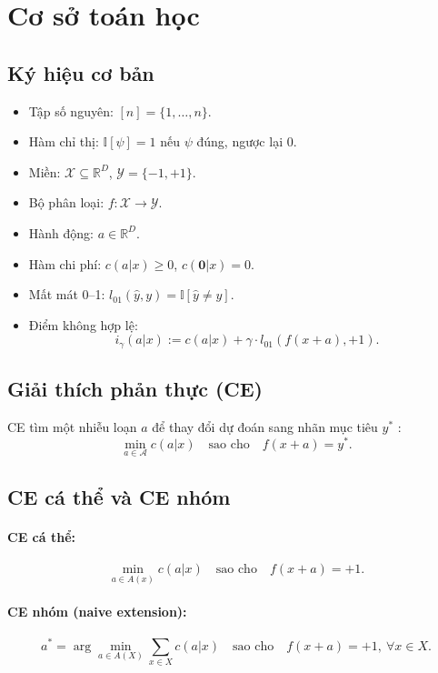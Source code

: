 \section{Cơ sở toán học}

\subsection{Ký hiệu cơ bản}
\begin{itemize}
    \item Tập số nguyên: $[n] = \{1,\dots,n\}$.
    \item Hàm chỉ thị: $\mathbb{I}[\psi] = 1$ nếu $\psi$ đúng, ngược lại $0$.
    \item Miền: $\mathcal{X} \subseteq \mathbb{R}^D$, $\mathcal{Y} = \{-1,+1\}$.
    \item Bộ phân loại: $f: \mathcal{X} \to \mathcal{Y}$.
    \item Hành động: $a \in \mathbb{R}^D$.
    \item Hàm chi phí: $c(a|x) \ge 0$, $c(\mathbf{0}|x) = 0$.
    \item Mất mát 0–1: $l_{01}(\hat{y},y) = \mathbb{I}[\hat{y} \neq y]$.
    \item Điểm không hợp lệ:
    \[
    i_\gamma(a|x) := c(a|x) + \gamma \cdot l_{01}(f(x+a),+1).
    \]
\end{itemize}

\subsection{Giải thích phản thực (CE)}
CE tìm một nhiễu loạn $a$ để thay đổi dự đoán sang nhãn mục tiêu $y^*$ \parencite{wachter2018counterfactualexplanationsopeningblack, karimi2021surveyalgorithmicrecoursedefinitions}:
\[
\min_{a \in \mathcal{A}} c(a|x) \quad \text{sao cho} \quad f(x+a) = y^*.
\]

\subsection{CE cá thể và CE nhóm}

\paragraph{CE cá thể:}
\[
\min_{a \in A(x)} c(a|x) \quad \text{sao cho} \quad f(x+a)=+1.
\tag{1}
\]

\paragraph{CE nhóm (naive extension):}
\[
a^* = \arg\min_{a \in A(X)} \sum_{x \in X} c(a|x)
\quad \text{sao cho} \quad f(x+a)=+1,\ \forall x \in X.
\tag{2}
\]


